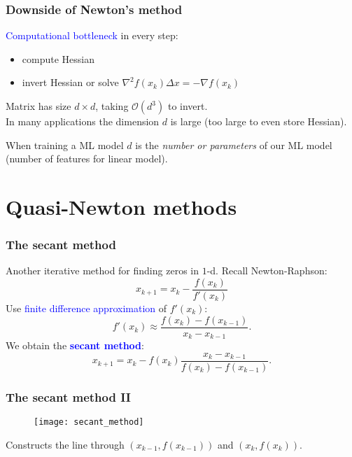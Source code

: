\documentclass{beamer}
\begin{document}
\begin{frame}
  \frametitle{Downside of Newton's method}
  \textcolor{blue}{Computational bottleneck} in every step:
  \begin{itemize}
    \item compute Hessian
    \item invert Hessian or solve $\nabla^2 f(x_k) \Delta x = - \nabla f(x_k)$
  \end{itemize}
  \vspace{1cm}
  Matrix has size $d\times d$, taking $\mathcal{O}(d^3)$ to invert.\\
  In many applications the dimension $d$ is large (too large to even store Hessian).

  \vspace{1cm}
  When training a ML model $d$ is the \textit{number or parameters} of our ML model (number of features for linear model).
\end{frame}


\section{Quasi-Newton methods}%

\begin{frame}
  \frametitle{The secant method}
  Another iterative method for finding zeros in $1$-d.
  Recall Newton-Raphson:
  \begin{equation}
    x_{k+1} = x_k - \frac{f(x_k)}{f'(x_k)}
  \end{equation}
  Use \textcolor{blue}{finite difference approximation} of $f'(x_k)$:
  \begin{equation}
    f'(x_k) \approx \frac{f(x_k) - f(x_{k-1})}{x_k - x_{k-1}}.
  \end{equation}
  We obtain the \textcolor{blue}{\textbf{secant method}}:
  \begin{equation}
    x_{k+1} = x_k - f(x_k) \frac{x_k - x_{k-1}}{f(x_k) - f(x_{k-1})}.
  \end{equation}

\end{frame}


\begin{frame}
  \frametitle{The secant method II}
  \begin{figure}[ht]
    \centering
    \texttt{[image: secant\_method]}
  \end{figure}
  Constructs the line through $(x_{k-1}, f(x_{k-1}))$ and $(x_k, f(x_k))$.
\end{frame}
\end{document}
